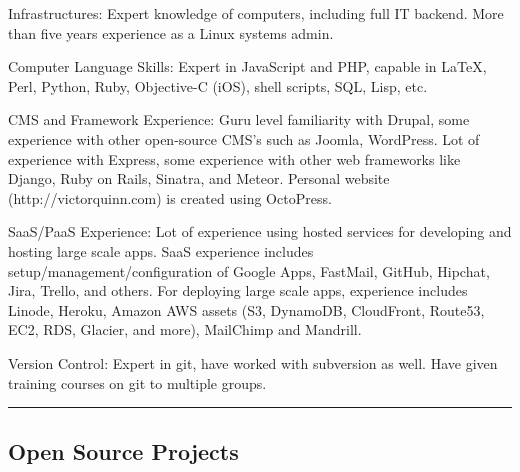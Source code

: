 \documentclass[10pt,letterpaper]{article}
\newenvironment{indentsection}[1]%
{\begin{list}{}%
	{\setlength{\leftmargin}{#1}}%
	\item[]%
}
{\end{list}}
\begin{document}
\begin{indentsection}{\parindent}
\begin{description*}
	\item[Infrastructures:]
	Expert knowledge of computers, including full IT backend. More than five years experience as a Linux systems admin.
	\item[Computer Language Skills:]
	Expert in JavaScript and PHP, capable in \LaTeX, Perl, Python, Ruby, Objective-C (iOS), shell scripts, SQL, Lisp, etc.
	\item[CMS and Framework Experience:]
	Guru level familiarity with Drupal, some experience with other open-source CMS's such as Joomla, WordPress. Lot of experience with Express, some experience with other web frameworks like Django, Ruby on Rails, Sinatra, and Meteor. Personal website (http://victorquinn.com) is created using OctoPress.
	\item[SaaS/PaaS Experience:]
	Lot of experience using hosted services for developing and hosting large scale apps. SaaS experience includes setup/management/configuration of Google Apps, FastMail, GitHub, Hipchat, Jira, Trello, and others. For deploying large scale apps, experience includes Linode, Heroku, Amazon AWS assets (S3, DynamoDB, CloudFront, Route53, EC2, RDS, Glacier, and more), MailChimp and Mandrill.
	\item[Version Control:]
	Expert in git, have worked with subversion as well. Have given training courses on git to multiple groups.
\end{description*}
\end{indentsection}

\begin{center}
\hrule
\vspace{-0.4em}
\subsection*{Open Source Projects}
\end{center}
\end{document}
